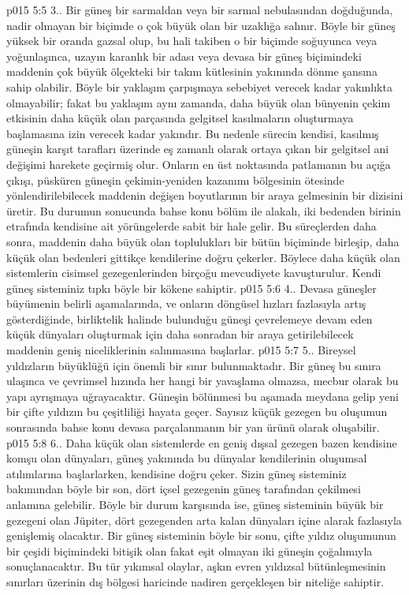 \vs p015 5:5 3.\bibnobreakspace {}. Bir güneş bir sarmaldan veya bir sarmal nebulasından doğduğunda, nadir olmayan bir biçimde o çok büyük olan bir uzaklığa salınır. Böyle bir güneş yüksek bir oranda gazsal olup, bu hali takiben o bir biçimde soğuyunca veya yoğunlaşınca, uzayın karanlık bir adası veya devasa bir güneş biçimindeki maddenin çok büyük ölçekteki bir takım kütlesinin yakınında dönme şansına sahip olabilir. Böyle bir yaklaşım çarpışmaya sebebiyet verecek kadar yakınlıkta olmayabilir; fakat bu yaklaşım aynı zamanda, daha büyük olan bünyenin çekim etkisinin daha küçük olan parçasında gelgitsel kasılmaların oluşturmaya başlamasına izin verecek kadar yakındır. Bu nedenle sürecin kendisi, kasılmış güneşin karşıt tarafları üzerinde eş zamanlı olarak ortaya çıkan bir gelgitsel ani değişimi harekete geçirmiş olur. Onların en üst noktasında patlamanın bu açığa çıkışı, püsküren güneşin çekimin\hyp{}yeniden kazanımı bölgesinin ötesinde yönlendirilebilecek maddenin değişen boyutlarının bir araya gelmesinin bir dizisini üretir. Bu durumun sonucunda bahse konu bölüm ile alakalı, iki bedenden birinin etrafında kendisine ait yörüngelerde sabit bir hale gelir. Bu süreçlerden daha sonra, maddenin daha büyük olan toplulukları bir bütün biçiminde birleşip, daha küçük olan bedenleri gittikçe kendilerine doğru çekerler. Böylece daha küçük olan sistemlerin cisimsel gezegenlerinden birçoğu mevcudiyete kavuşturulur. Kendi güneş sisteminiz tıpkı böyle bir kökene sahiptir.
\vs p015 5:6 4.\bibnobreakspace {}. Devasa güneşler büyümenin belirli aşamalarında, ve onların döngüsel hızları fazlasıyla artış gösterdiğinde, birliktelik halinde bulunduğu güneşi çevrelemeye devam eden küçük dünyaları oluşturmak için daha sonradan bir araya getirilebilecek maddenin geniş niceliklerinin salınmasına başlarlar.
\vs p015 5:7 5.\bibnobreakspace {}. Bireysel yıldızların büyüklüğü için önemli bir sınır bulunmaktadır. Bir güneş bu sınıra ulaşınca ve çevrimsel hızında her hangi bir yavaşlama olmazsa, mecbur olarak bu yapı ayrışmaya uğrayacaktır. Güneşin bölünmesi bu aşamada meydana gelip yeni bir çifte yıldızın bu çeşitliliği hayata geçer. Sayısız küçük gezegen bu oluşumun sonrasında bahse konu devasa parçalanmanın bir yan ürünü olarak oluşabilir.
\vs p015 5:8 6.\bibnobreakspace {}. Daha küçük olan sistemlerde en geniş dışsal gezegen bazen kendisine komşu olan dünyaları, güneş yakınında bu dünyalar kendilerinin oluşumsal atılımlarına başlarlarken, kendisine doğru çeker. Sizin güneş sisteminiz bakımından böyle bir son, dört içsel gezegenin güneş tarafından çekilmesi anlamına gelebilir. Böyle bir durum karşısında ise, güneş sisteminin büyük bir gezegeni olan Jüpiter, dört gezegenden arta kalan dünyaları içine alarak fazlasıyla genişlemiş olacaktır. Bir güneş sisteminin böyle bir sonu, çifte yıldız oluşumunun bir çeşidi biçimindeki bitişik olan fakat eşit olmayan iki güneşin çoğalımıyla sonuçlanacaktır. Bu tür yıkımsal olaylar, aşkın evren yıldızsal bütünleşmesinin sınırları üzerinin dış bölgesi haricinde nadiren gerçekleşen bir niteliğe sahiptir.
